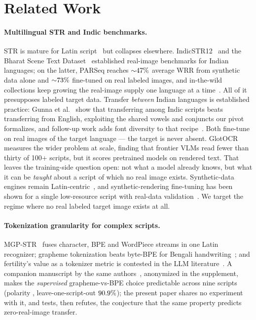 \section{Related Work}
\label{sec:related}

\paragraph{Multilingual STR and Indic benchmarks.}
STR is mature for Latin script~\cite{parseq} but collapses elsewhere. IndicSTR12~\cite{indicstr12}
and the Bharat Scene Text Dataset~\cite{bstd} established real-image benchmarks for Indian
languages; on the latter, PARSeq reaches ${\sim}47\%$ average WRR from synthetic data alone and
${\sim}73\%$ fine-tuned on real labeled images, and in-the-wild collections keep growing
the real-image supply one language at a time~\cite{banglawild}. All of it presupposes labeled
target data. Transfer \emph{between} Indian languages is established practice: Gunna et
al.~\cite{indictransfer} show that transferring among Indic scripts beats transferring from
English, exploiting the shared vowels and conjuncts our pivot formalizes, and follow-up work adds
font diversity to that recipe~\cite{indicfonts}. Both fine-tune on real images of the target
language --- the target is never absent. GlotOCR~\cite{glotocr} measures the wider problem at scale,
finding that frontier VLMs read fewer than thirty of 100+ scripts, but it scores pretrained models
on rendered text. That leaves the training-side question open: not what a model already knows, but
what it can be \emph{taught} about a script of which no real image exists. Synthetic-data engines
remain Latin-centric~\cite{unionst}, and synthetic-rendering fine-tuning has been shown for a
single low-resource script with real-data validation~\cite{manchu}. We target the regime where no
real labeled target image exists at all.

\paragraph{Tokenization granularity for complex scripts.}
MGP-STR~\cite{mgpstr} fuses character, BPE and WordPiece streams in one Latin recognizer;
grapheme tokenization beats byte-BPE for Bengali handwriting~\cite{gradet}; and fertility's value
as a tokenizer metric is contested in the LLM literature~\cite{beyondfertility}. A companion
manuscript by the same authors~\cite{parallelsub}, anonymized in the supplement, makes the
\emph{supervised} grapheme-vs-BPE choice predictable across nine scripts (polarity \lawPolarity,
leave-one-script-out $90.9\%$); the present paper shares no experiment with it, and tests, then
refutes, the conjecture that the same property predicts zero-real-image transfer.

